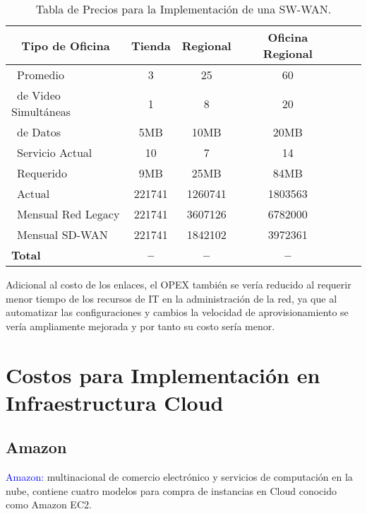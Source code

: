 \begin{table}[ht]
	\caption{Tabla de Precios  para la Implementación de una SW-WAN.}
	\label{tab:hla:results}
\centering
\begin{tabular}{lccccc}
	\toprule
	\multicolumn{1}{c}{\textbf{Tipo de Oficina}} 	& \textbf{Tienda}	& \textbf{Regional}	& \textbf{Oficina Regional}\\
	\midrule
\cite{Usuarios}~Promedio 		& 3 & 25 & 60	 \\
\cite{Sesiones}~de Video Simultáneas & 1& 8	& 20	\\
\cite{Trafico}~de Datos	& 5MB	& 10MB	& 20MB	\\
\cite{BW}~Servicio Actual		& 10& 7	& 14	 \\
\cite{BW}~Requerido	& 9MB	& 25MB	& 84MB	 \\
\cite{Costo}~Actual			& 221741	& 1260741	& 1803563	\\
\cite{Costo}~Mensual Red Legacy		& 221741	& 3607126	& 6782000 \\
\cite{Costo}~Mensual SD-WAN	& 221741	& 1842102	& 3972361\\
	\midrule
	\textbf{Total}			& \textbf{--}		& \textbf{--}		& \textbf{--} \\
	\bottomrule
\end{tabular}
\end{table}
Adicional al costo de los enlaces, el OPEX también se vería reducido al requerir menor tiempo de los recursos de IT en la administración de la red, ya que al automatizar las configuraciones y cambios la velocidad de aprovisionamiento se vería ampliamente mejorada y por tanto su costo sería menor.


\section{Costos para Implementación en Infraestructura Cloud} %
\label{sec:Costos para Implementación en Infraestructura Cloud}


\subsection{Amazon}

\textcolor{blue}{Amazon:} multinacional de comercio electrónico y servicios de computación en la nube, contiene cuatro modelos para compra de instancias en Cloud conocido como Amazon EC2.

